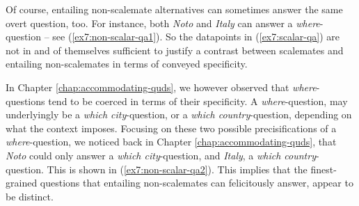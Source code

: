 \begin{exe}
	\ex\label{ex7:scalar-qa}
	\begin{xlist}
		\label{ex7:scalar-qa-some-all}
		\label{ex7:scalar-qa-sometimes-always}
		\label{ex7:scalar-qa-warm-hot}
	\end{xlist}
\end{exe}

Of course, entailing non-scalemate alternatives can sometimes answer the same overt question, too.  For instance, both \textit{Noto} and \textit{Italy} can answer a \textit{where}-question -- see (\ref{ex7:non-scalar-qa1}). So the datapoints in (\ref{ex7:scalar-qa}) are not in and of themselves sufficient to justify a contrast between scalemates and entailing non-scalemates in terms of conveyed specificity.

\begin{exe}
	\label{ex7:non-scalar-qa1}
\end{exe}

In Chapter \ref{chap:accommodating-quds}, we however observed that \textit{where}-questions tend to be coerced in terms of their specificity. A \textit{where}-question, may underlyingly be a \textit{which city}-question, or a \textit{which country}-question, depending on what the context imposes. Focusing on these two possible precisifications of a \textit{where}-question, we noticed back in Chapter \ref{chap:accommodating-quds}, that \textit{Noto} could only answer a \textit{which city}-question, and \textit{Italy}, a \textit{which country}-question. This is shown in (\ref{ex7:non-scalar-qa2}). This implies that the finest-grained questions that entailing non-scalemates can felicitously answer, appear to be distinct.

\begin{exe}
	\ex \label{ex7:non-scalar-qa2}
	\begin{xlist}
		\label{ex7:non-scalar-qa-city}
		\label{ex7:non-scalar-qa-country}
	\end{xlist}
\end{exe}

